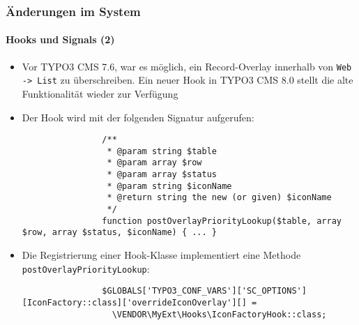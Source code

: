 \begin{frame}[fragile]
	\frametitle{Änderungen im System}
	\framesubtitle{Hooks und Signals (2)}

	\lstset{basicstyle=\tiny\ttfamily}

	\begin{itemize}

		\item Vor TYPO3 CMS 7.6, war es möglich, ein Record-Overlay innerhalb von \texttt{Web -> List} zu überschreiben. Ein neuer Hook in TYPO3 CMS 8.0 stellt die alte Funktionalität wieder zur Verfügung

		\item Der Hook wird mit der folgenden Signatur aufgerufen:
			\begin{lstlisting}
				/**
				 * @param string $table
				 * @param array $row
				 * @param array $status
				 * @param string $iconName
				 * @return string the new (or given) $iconName
				 */
				function postOverlayPriorityLookup($table, array $row, array $status, $iconName) { ... }
			\end{lstlisting}

		\item Die Registrierung einer Hook-Klasse implementiert eine Methode \texttt{postOverlayPriorityLookup}:

			\begin{lstlisting}
				$GLOBALS['TYPO3_CONF_VARS']['SC_OPTIONS'][IconFactory::class]['overrideIconOverlay'][] =
				  \VENDOR\MyExt\Hooks\IconFactoryHook::class;
			\end{lstlisting}

	\end{itemize}

\end{frame}

